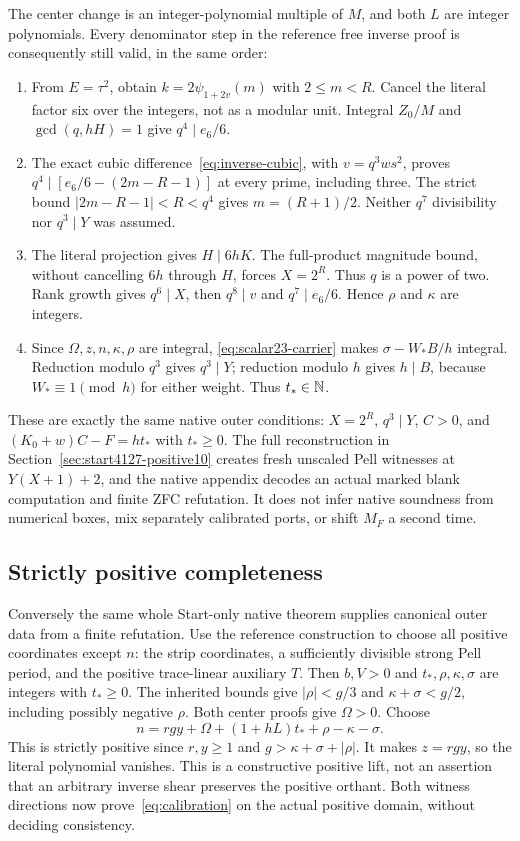 The center change is an integer-polynomial multiple of $M$, and both $L$
are integer polynomials. Every denominator step in the reference free inverse
proof is consequently still valid, in the same order:
\begin{enumerate}
\item From $E=\tau^2$, obtain $k=2\psi_{1+2v}(m)$ with $2\le m<R$.
Cancel the literal factor six over the integers, not as a modular unit.
Integral $Z_0/M$ and $\gcd(q,hH)=1$ give $q^4\mid e_6/6$.
\item The exact cubic difference~\eqref{eq:inverse-cubic}, with
$v=q^3ws^2$, proves $q^4\mid[e_6/6-(2m-R-1)]$ at every prime, including
three. The strict bound $|2m-R-1|<R<q^4$ gives $m=(R+1)/2$.
Neither $q^7$ divisibility nor $q^3\mid Y$ was assumed.
\item The literal projection gives $H\mid6hK$. The full-product magnitude
bound, without cancelling $6h$ through $H$, forces $X=2^R$. Thus $q$ is
a power of two. Rank growth gives $q^6\mid X$, then $q^8\mid v$ and
$q^7\mid e_6/6$. Hence $\rho$ and $\kappa$ are integers.
\item Since $\Omega,z,n,\kappa,\rho$ are integral,
\eqref{eq:scalar23-carrier} makes $\sigma-W_*B/h$ integral. Reduction
modulo $q^3$ gives $q^3\mid Y$; reduction modulo $h$ gives $h\mid B$,
because $W_*\equiv1\pmod h$ for either weight. Thus $t_*\in\mathbb N$.
\end{enumerate}
These are exactly the same native outer conditions:
$X=2^R$, $q^3\mid Y$, $C>0$, and $(K_0+w)C-F=ht_*$ with $t_*\ge0$.
The full reconstruction in Section~\ref{sec:start4127-positive10} creates
fresh unscaled Pell witnesses at $Y(X+1)+2$, and the native appendix decodes
an actual marked blank computation and finite ZFC refutation. It does not
infer native soundness from numerical boxes, mix separately calibrated
ports, or shift $M_F$ a second time.

\subsection{Strictly positive completeness}
Conversely the same whole Start-only native theorem supplies canonical outer
data from a finite refutation. Use the reference construction to choose all
positive coordinates except $n$: the strip coordinates, a sufficiently
divisible strong Pell period, and the positive trace-linear auxiliary $T$.
Then $b,V>0$ and $t_*,\rho,\kappa,\sigma$ are integers with $t_*\ge0$.
The inherited bounds give $|\rho|<g/3$ and $\kappa+\sigma<g/2$,
including possibly negative $\rho$. Both center proofs give $\Omega>0$.
Choose
\[
 n=rgy+\Omega+(1+hL)t_*+\rho-\kappa-\sigma.
\]
This is strictly positive since $r,y\ge1$ and
$g>\kappa+\sigma+|\rho|$. It makes $z=rgy$, so the literal polynomial
vanishes. This is a constructive positive lift, not an assertion that an
arbitrary inverse shear preserves the positive orthant. Both witness
directions now prove~\eqref{eq:calibration} on the actual positive domain,
without deciding consistency.

